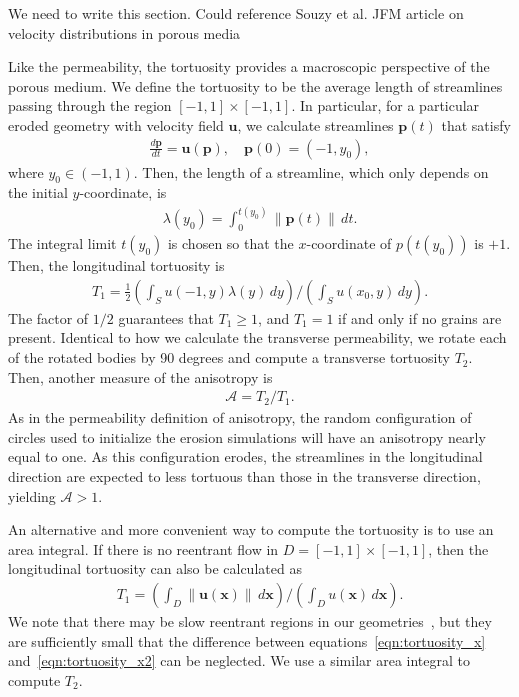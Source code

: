 \documentclass[3p]{elsarticle}
\newcommand{\pp}{{\mathbf{p}}}
\newcommand{\uu}{{\mathbf{u}}}
\newcommand{\xx}{{\mathbf{x}}}
\newcommand{\anis}{\mathcal{A}}
\begin{document}
We need to write this section.
Could reference Souzy et al. JFM article on velocity distributions in porous media \cite{souzy2020velocity}

Like the permeability, the tortuosity provides a macroscopic perspective
of the porous medium. We define the tortuosity to be the average length
of streamlines passing through the region $[-1,1] \times [-1,1]$. In
particular, for a particular eroded geometry with velocity field $\uu$,
we calculate streamlines $\pp(t)$ that satisfy
\begin{align}
  \frac{d\pp}{dt} = \uu(\pp), \quad \pp(0) = (-1,y_0),
\end{align}
where $y_0 \in (-1,1)$. Then, the length of a streamline, which only
depends on the initial $y$-coordinate, is
\begin{align}
  \lambda(y_0) = \int_{0}^{t(y_0)} \|\pp(t)\| \,dt.
\end{align}
The integral limit $t(y_0)$ is chosen so that the $x$-coordinate of
$p(t(y_0))$ is $+1$. Then, the longitudinal tortuosity is
\begin{align}
  T_1 = \frac{1}{2}\left(\int_{S}u(-1,y)\lambda(y)\,dy \right)
  \Bigg/
  \left(\int_{S}u(x_0,y)\,dy \right).
  \label{eqn:tortuosity_x}
\end{align} 
The factor of $1/2$ guarantees that $T_1 \geq 1$, and $T_1 = 1$ if and only if no grains are present. Identical to how we calculate the transverse permeability, we rotate each of the rotated bodies by 90 degrees and compute a transverse tortuosity $T_2$. Then, another measure of the anisotropy is
\begin{align}
  \anis = T_2/T_1.
\end{align}
As in the permeability definition of anisotropy, the random configuration of circles used to initialize the erosion simulations will have an anisotropy nearly equal to one. As this configuration erodes, the streamlines in the longitudinal direction are expected to less tortuous than those in the transverse direction, yielding $\anis > 1$.

An alternative and more convenient way to compute the tortuosity is to
use an area integral. If there is no reentrant flow in $D = [-1,1]
\times [-1,1]$, then the longitudinal tortuosity can also be calculated
as~\citep{dud-koz-mat2011}
\begin{align}
  T_1 = \left(\int_D \|\uu(\xx)\|\, d\xx \right) \Bigg/
      \left(\int_D u(\xx)\, d\xx \right).
  \label{eqn:tortuosity_x2}
\end{align}
We note that there may be slow reentrant regions in our geometries~\cite{chiu2020viscous}, but they are sufficiently small that the difference between equations~\eqref{eqn:tortuosity_x} and~\eqref{eqn:tortuosity_x2} can be neglected. We use a similar area integral to compute $T_2$.
\end{document}
